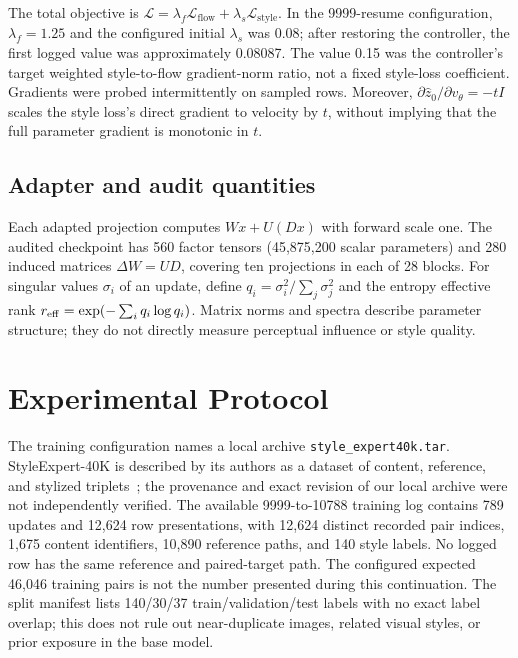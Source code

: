 \documentclass[10pt,letterpaper]{article}
\begin{document}
The total objective is $\mathcal L=\lambda_f\mathcal L_{\mathrm{flow}}+\lambda_s\mathcal L_{\mathrm{style}}$. In the 9999-resume configuration, $\lambda_f=1.25$ and the configured initial $\lambda_s$ was 0.08; after restoring the controller, the first logged value was approximately 0.08087. The value 0.15 was the controller's target weighted style-to-flow gradient-norm ratio, not a fixed style-loss coefficient. Gradients were probed intermittently on sampled rows. Moreover, $\partial\widehat z_0/\partial v_\theta=-tI$ scales the style loss's direct gradient to velocity by $t$, without implying that the full parameter gradient is monotonic in $t$.

\subsection{Adapter and audit quantities}
Each adapted projection computes $Wx+U(Dx)$ with forward scale one. The audited checkpoint has 560 factor tensors (45,875,200 scalar parameters) and 280 induced matrices $\Delta W=UD$, covering ten projections in each of 28 blocks. For singular values $\sigma_i$ of an update, define $q_i=\sigma_i^2/\sum_j\sigma_j^2$ and the entropy effective rank $r_{\rm eff}=\exp(-\sum_iq_i\log q_i)$. Matrix norms and spectra describe parameter structure; they do not directly measure perceptual influence or style quality.

\section{Experimental Protocol}
The training configuration names a local archive \texttt{style\_expert40k.tar}. StyleExpert-40K is described by its authors as a dataset of content, reference, and stylized triplets~\cite{styleexpert2026}; the provenance and exact revision of our local archive were not independently verified. The available 9999-to-10788 training log contains 789 updates and 12,624 row presentations, with 12,624 distinct recorded pair indices, 1,675 content identifiers, 10,890 reference paths, and 140 style labels. No logged row has the same reference and paired-target path. The configured expected 46,046 training pairs is not the number presented during this continuation. The split manifest lists 140/30/37 train/validation/test labels with no exact label overlap; this does not rule out near-duplicate images, related visual styles, or prior exposure in the base model.
\end{document}
